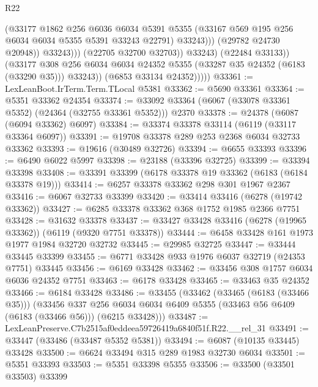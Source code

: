 \begin{lexlean}{R22}
\begin{coremodule}
                                (@33177
                                  @1862
                                  @256
                                  @6036
                                  @6034
                                  @5391
                                  @5355
                                  (@33167 @569 @195 @256 @6034 @6034 @5355 @5391 @33243 @22791)
                                  @33243)))
                            (@29782 @24730 @20948))
                          @33243)))
                    (@22705 @32700 @32703))
                  @33243)
                (@22484 @33133))
              (@33177
                @308
                @256
                @6034
                @6034
                @24352
                @5355
                (@33287 @35 @24352 (@6183 (@33290 @35)))
                @33243))
            (@6853 @33134 @24352)))))
@33361 := LexLeanBoot.IrTerm.Term.TLocal @5381
@33362 := @5690 @33361
@33364 := @5351 @33362 @24354
@33374 := @33092 @33364 (@6067 (@33078 @33361 @5352) (@24364 (@32755 @33361 @5352))) @2370
@33378 := @24378 (@6087 (@6094 @33362) @6097)
@33384 := @33374 @33378 @33114 (@6119 (@33117 @33364 @6097))
@33391 := @19708 @33378 @289 @253 @2368 @6034 @32733 @33362
@33393 := @19616 (@30489 @32726)
@33394 := @6655 @33393
@33396 := @6490 @6022 @5997
@33398 := @23188 (@33396 @32725)
@33399 := @33394 @33398
@33408 := @33391 @33399 (@6178 @33378 @19 @33362 (@6183 (@6184 @33378 @19)))
@33414 := @6257 @33378 @33362 @298 @301 @1967 @2367
@33416 := @6067 @32733 @33399
@33420 := @33414 @33416 (@6278 (@19742 @33362))
@33427 := @6285 @33378 @33362 @368 @1752 @1985 @2366 @7751
@33428 := @31632 @33378
@33437 := @33427 @33428 @33416 (@6278 (@19965 @33362)) (@6119 (@9320 @7751 @33378))
@33444 := @6458 @33428 @161 @1973 @1977 @1984 @32720 @32732
@33445 := @29985 @32725
@33447 := @33444 @33445 @33399
@33455 := @6771 @33428 @933 @1976 @6037 @32719 (@24353 @7751) @33445
@33456 := @6169 @33428
@33462 := @33456 @308 @1757 @6034 @6036 @24352 @7751
@33463 := @6178 @33428
@33465 := @33463 @35 @24352
@33466 := @6184 @33428
@33486 := @33455
    (@33462
      (@33465 (@6183 (@33466 @35)))
      (@33456
        @337
        @256
        @6034
        @6034
        @6409
        @5355
        (@33463 @56 @6409 (@6183 (@33466 @56)))
        (@6215 @33428)))
@33487 := LexLeanPreserve.C7b2515af0eddeea59726419a6840f51f.R22.__rel_31
@33491 := @33447 (@33486 (@33487 @5352 @5381))
@33494 := @6087 (@10135 @33445) @33428
@33500 := @6624 @33494 @315 @289 @1983 @32730 @6034
@33501 := @5351 @33393
@33503 := @5351 @33398 @5355
@33506 := @33500 (@33501 @33503) @33399

\end{coremodule}
\end{lexlean}
